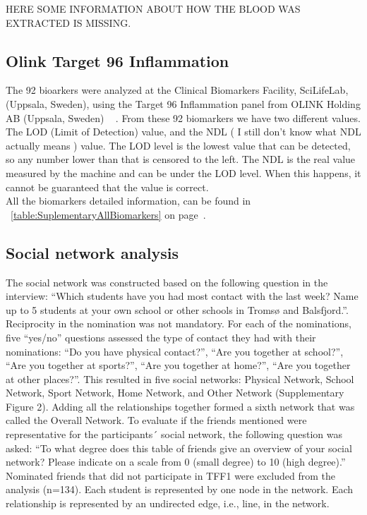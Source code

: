 \documentclass[10pt, a4paper, onecolumn]{article} %
\begin{document}
HERE SOME INFORMATION ABOUT HOW THE BLOOD WAS EXTRACTED IS MISSING.\\

\subsection{Olink Target 96 Inflammation} 

The 92 bioarkers were analyzed at the Clinical Biomarkers Facility, SciLifeLab, (Uppsala, Sweden), using the Target 96 Inflammation panel from OLINK Holding AB (Uppsala, Sweden) ~\cite{ref:OlinkInflammation} . From these 92 biomarkers we have two different values. The LOD (Limit of Detection) value, and the NDL ( I still don’t know what NDL actually means ) value. The LOD level is the lowest value that can be detected, so any number lower than that is censored to the left. The NDL is the real value measured by the machine and can be under the LOD level. When this happens, it cannot be guaranteed that the value is correct.\\

All the biomarkers detailed information, can be found in ~\ref{table:SuplementaryAllBiomarkers} on page~\pageref{table:SuplementaryAllBiomarkers}.\\

\subsection{Social network analysis}

The social network was constructed based on the following question in the interview: “Which students have you had most contact with the last week? Name up to 5 students at your own school or other schools in Tromsø and Balsfjord.”. Reciprocity in the nomination was not mandatory. For each of the nominations, five “yes/no” questions assessed the type of contact they had with their nominations: “Do you have physical contact?”, “Are you together at school?”, “Are you together at sports?”, “Are you together at home?”, “Are you together at other places?”. This resulted in five social networks: Physical Network, School Network, Sport Network, Home Network, and Other Network (Supplementary Figure 2). Adding all the relationships together formed a sixth network that was called the Overall Network. To evaluate if the friends mentioned were representative for the participants´ social network, the following question was asked: “To what degree does this table of friends give an overview of your social network? Please indicate on a scale from 0 (small degree) to 10 (high degree).”  Nominated friends that did not participate in TFF1 were excluded from the analysis (n=134). Each student is represented by one node in the network. Each relationship is represented by an undirected edge, i.e., line, in the network.\\
\end{document}
